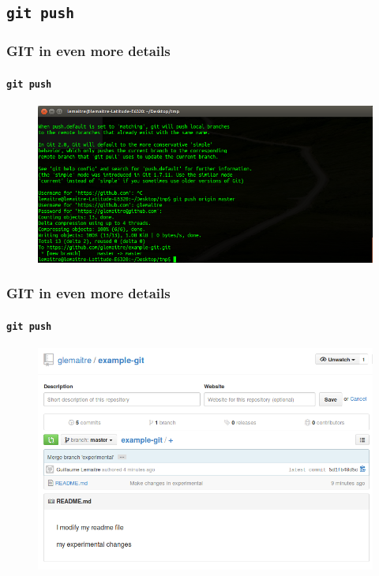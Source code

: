 \documentclass{beamer}
\begin{document}
\subsection{\texttt{git push}}

\begin{frame}
  \frametitle{GIT in even more details}
  \framesubtitle{\texttt{git push}}
  \begin{figure}
      \centering
      \includegraphics[width=.65\textwidth]{./images/workflow/push.png}
    \end{figure}
\end{frame}

\begin{frame}
  \frametitle{GIT in even more details}
  \framesubtitle{\texttt{git push}}
  \begin{figure}
      \centering
      \includegraphics[width=.65\textwidth]{./images/workflow/github-2.png}
    \end{figure}
\end{frame}
\end{document}
